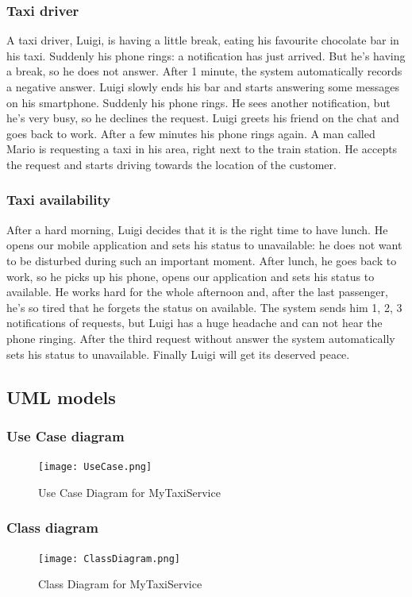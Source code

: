 		\subsubsection{Taxi driver}
			A taxi driver, Luigi, is having a little break, eating his favourite chocolate bar in his taxi. Suddenly
			his phone rings: a notification has just arrived. But he's having a break, so he does not answer.
			After 1 minute, the system automatically records a negative answer.
			Luigi slowly ends his bar and starts answering some messages on his smartphone. Suddenly his phone
			rings. He sees another notification, but he's very busy, so he declines the request. Luigi greets his
			friend on the chat and goes back to work. After a few minutes his phone rings again. A man called
			Mario is requesting a taxi in his area, right next to the train station. He accepts the request and
			starts driving towards the location of the customer.
		\subsubsection{Taxi availability}
			After a hard morning, Luigi decides that it is the right time to have lunch. He opens our mobile
			application and sets his status to unavailable: he does not want to be disturbed during such an
			important moment. After lunch, he goes back to work, so he picks up his phone, opens our
			application and sets his status to available. He works hard for the whole afternoon and, after the
			last passenger, he's so tired that he forgets the status on available. The system sends him 1, 2, 3
			notifications of requests, but Luigi has a huge headache and can not hear the phone ringing. After
			the third request without answer the system automatically sets his status to unavailable.
			Finally Luigi will get its deserved peace.
	\newpage
	\subsection{UML models}
		\subsubsection{Use Case diagram}
			\begin{figure}[h!]
				\centering
				\graphicspath{ {../SE2_IMAGES/} }
				\texttt{[image: UseCase.png]}
				\caption{Use Case Diagram for MyTaxiService}
			\end{figure}
		\newpage
		\subsubsection{Class diagram}
			\begin{figure}[h!]
				\centering
				\graphicspath{ {../SE2_IMAGES/} }
				\texttt{[image: ClassDiagram.png]}
				\caption{Class Diagram for MyTaxiService}
			\end{figure}

